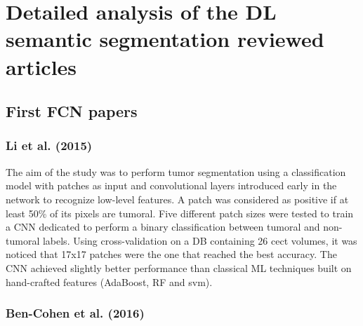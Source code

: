 \chapter{Detailed analysis of the DL semantic segmentation reviewed
articles
}\label{detailed-analysis-of-the-dl-semantic-segmentation-reviewed-articles}

\section{First FCN papers}\label{first-fcn-papers}

\subsection*{Li et al. (2015)}\label{li-et-al.-2015}

The aim of the study was to perform tumor segmentation using a
classification model with patches as input and convolutional layers
introduced early in the network to recognize low-level features. A patch
was considered as positive if at least 50\% of its pixels are tumoral.
Five different patch sizes were tested to train a CNN dedicated to
perform a binary classification between tumoral and non-tumoral labels.
Using cross-validation on a DB containing 26 \ac{cect} volumes, it was
noticed that 17x17 patches were the one that reached the best accuracy.
The CNN achieved slightly better performance than classical ML
techniques built on hand-crafted features (AdaBoost, RF and \ac{svm}).

\subsection*{Ben-Cohen et al. (2016)}\label{ben-cohen-et-al.-2016}

